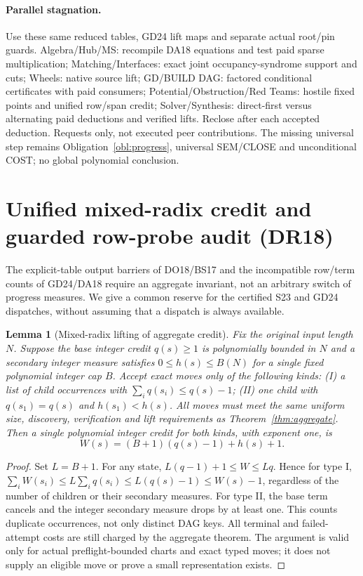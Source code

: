 \documentclass[11pt]{article}
\newtheorem{lemma}[theorem]{Lemma}
\begin{document}
\paragraph{Parallel stagnation.}
Use these same reduced tables, GD24 lift maps and separate actual root/pin guards. Algebra/Hub/MS: recompile DA18 equations and test paid sparse multiplication; Matching/Interfaces: exact joint occupancy-syndrome support and cuts; Wheels: native source lift; GD/BUILD DAG: factored conditional certificates with paid consumers; Potential/Obstruction/Red Teams: hostile fixed points and unified row/span credit; Solver/Synthesis: direct-first versus alternating paid deductions and verified lifts. Reclose after each accepted deduction. Requests only, not executed peer contributions. The missing universal step remains Obligation~\ref{obl:progress}, universal SEM/CLOSE and unconditional COST; no global polynomial conclusion.


\section{Unified mixed-radix credit and guarded row-probe audit (DR18)}\label{sec:dr18}
The explicit-table output barriers of DO18/BS17 and the incompatible row/term counts of GD24/DA18 require an aggregate invariant, not an arbitrary switch of progress measures. We give a common reserve for the certified S23 and GD24 dispatches, without assuming that a dispatch is always available.

\begin{lemma}[Mixed-radix lifting of aggregate credit]\label{lem:dr18-credit}
Fix the original input length $N$. Suppose the base integer credit $q(s)\ge1$ is polynomially bounded in $N$ and a secondary integer measure satisfies $0\le h(s)\le B(N)$ for a single fixed polynomial integer cap $B$. Accept exact moves only of the following kinds: (I) a list of child occurrences with $\sum_i q(s_i)\le q(s)-1$; (II) one child with $q(s_1)=q(s)$ and $h(s_1)<h(s)$. All moves must meet the same uniform size, discovery, verification and lift requirements as Theorem~\ref{thm:aggregate}. Then a single polynomial integer credit for both kinds, with exponent one, is
\[
W(s)=(B+1)(q(s)-1)+h(s)+1.
\]
\end{lemma}
\begin{proof}
Set $L=B+1$. For any state, $L(q-1)+1\le W\le Lq$. Hence for type I, $\sum_i W(s_i)\le L\sum_i q(s_i)\le L(q(s)-1)\le W(s)-1$, regardless of the number of children or their secondary measures. For type II, the base term cancels and the integer secondary measure drops by at least one. This counts duplicate occurrences, not only distinct DAG keys. All terminal and failed-attempt costs are still charged by the aggregate theorem. The argument is valid only for actual preflight-bounded charts and exact typed moves; it does not supply an eligible move or prove a small representation exists.
\end{proof}
\end{document}
